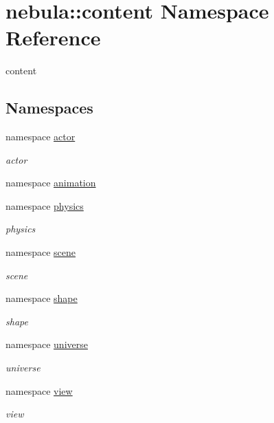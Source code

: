 \hypertarget{namespacenebula_1_1content}{
\section{nebula::content Namespace Reference}
\label{namespacenebula_1_1content}
}


content  
\subsection*{Namespaces}
\begin{DoxyCompactItemize}
\item 
namespace \hyperlink{namespacenebula_1_1content_1_1actor}{actor}


\begin{DoxyCompactList}\small\item\em actor \item\end{DoxyCompactList}\item 
namespace \hyperlink{namespacenebula_1_1content_1_1animation}{animation}
\item 
namespace \hyperlink{namespacenebula_1_1content_1_1physics}{physics}


\begin{DoxyCompactList}\small\item\em physics \item\end{DoxyCompactList}\item 
namespace \hyperlink{namespacenebula_1_1content_1_1scene}{scene}


\begin{DoxyCompactList}\small\item\em scene \item\end{DoxyCompactList}\item 
namespace \hyperlink{namespacenebula_1_1content_1_1shape}{shape}


\begin{DoxyCompactList}\small\item\em shape \item\end{DoxyCompactList}\item 
namespace \hyperlink{namespacenebula_1_1content_1_1universe}{universe}


\begin{DoxyCompactList}\small\item\em universe \item\end{DoxyCompactList}\item 
namespace \hyperlink{namespacenebula_1_1content_1_1view}{view}


\begin{DoxyCompactList}\small\item\em view \item\end{DoxyCompactList}\end{DoxyCompactItemize}
